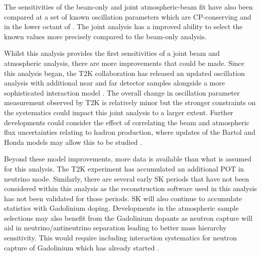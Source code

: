 The sensitivities of the beam-only and joint atmospheric-beam fit have also been compared at a set of known oscillation parameters which are CP-conserving and in the lower octant of . The joint analysis has a  improved ability to select the known values more precisely compared to the beam-only analysis.

Whilst this analysis provides the first sensitivities of a joint beam and atmospheric analysis, there are more improvements that could be made. Since this analysis began, the T2K collaboration has released an updated oscillation analysis with additional near and far detector samples alongside a more sophisticated interaction model \cite{Bronner2022-wd}. The overall change in oscillation parameter measurement observed by T2K is relatively minor but the stronger constraints on the systematics could impact this joint analysis to a larger extent.
Further developments could consider the effect of correlating the beam and atmospheric flux uncertainties relating to hadron production, where updates of the Bartol and Honda models may allow this to be studied \cite{Sato2022-ss}. 

Beyond these model improvements, more data is available than what is assumed for this analysis. The T2K experiment has accumulated an additional POT in neutrino mode. Similarly, there are several early SK periods that have not been considered within this analysis as the reconstruction software used in this analysis has not been validated for those periods. SK will also continue to accumulate statistics with Gadolinium doping. Developments in the atmospheric sample selections may also benefit from the Gadolinium dopants as neutron capture will aid in neutrino/antineutrino separation leading to better mass hierarchy sensitivity. This would require including interaction systematics for neutron capture of Gadolinium which has already started \cite{10.48550/arxiv.2209.08609}.

